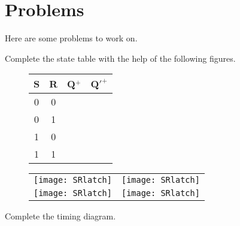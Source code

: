 
\pagebreak
\section{Problems}
Here are some problems to work on.
\begin{description}
    \item[Complete the state table with the help of the following figures.]

        \begin{tabular}{c|c||c|c}
            S & R & Q$^+$ & Q$'^+$ \\ \hline
            0 & 0 &  &  \\ \hline
            0 & 1 &  &  \\ \hline
            1 & 0 &  &  \\ \hline
            1 & 1 &  &  \\
        \end{tabular}

        \begin{tabular}{p{2in} p{2in}}
            \texttt{[image: SRlatch]} & \texttt{[image: SRlatch]} \\
            \texttt{[image: SRlatch]} & \texttt{[image: SRlatch]} \\
        \end{tabular}

        \vspace{0.2in}

    \item[Complete the timing diagram.]

\end{description}
